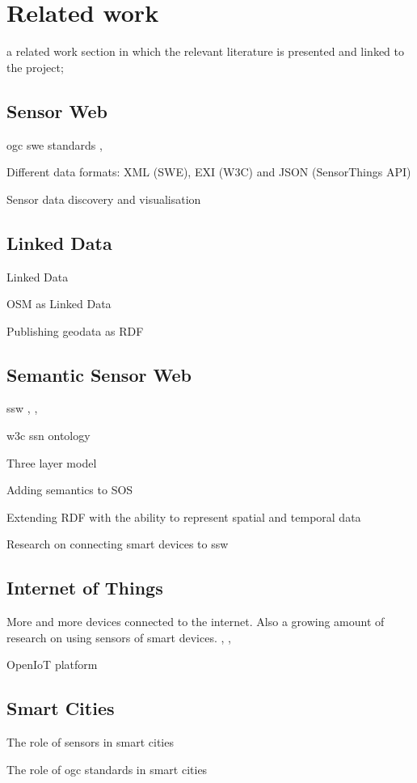 \chapter{Related work}
\label{chap:rw}

a related work section in which the relevant literature is presented and linked to the project;


\section{Sensor Web}
\ac{ogc} \ac{swe} standards \cite{SW:OGC}, \cite{SW:Botts}

Different data formats: XML (SWE), EXI (W3C) and JSON (SensorThings API) \cite{IOT:Zanelli}

Sensor data discovery \cite{SW:OGC2} and visualisation \cite{SW:Yoo}


\section{Linked Data}
Linked Data \cite{LD:Berners-lee}

OSM as Linked Data \cite{LD:Auer}

Publishing geodata as RDF \cite{LD:Missier}


\section{Semantic Sensor Web}
\ac{ssw} \cite{SSW:Sheth}, \cite{SSW:deMel}, \cite{SSW:Bakillah}

\ac{w3c} \ac{ssn} ontology \cite{SSW:SSN_incubatorGroup}

Three layer model 

Adding semantics to SOS \cite{SSW:Henson}

Extending RDF with the ability to represent spatial and temporal data \cite{SSW:Koubarakis}

Research on connecting smart devices to \ac{ssw} \cite{SSW:Vera}  


\section{Internet of Things}
More and more devices connected to the internet. Also a growing amount of research on using sensors of smart devices. \cite{IOT:Waher}, \cite{SSW:Calbimonte}, \cite{IOT:Zarko}


OpenIoT platform \cite{IOT:Calbimonte}


\section{Smart Cities}
The role of sensors in smart cities \cite{IOT:Zanelli}

The role of \ac{ogc} standards in smart cities \cite{SC:OGC}
